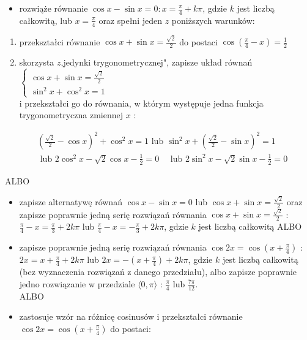 \documentclass[10pt]{article}
\begin{document}
\begin{itemize}
  \item rozwiąże równanie $\cos x-\sin x=0: x=\frac{\pi}{4}+k \pi$, gdzie $k$ jest liczbą całkowitą, lub $x=\frac{\pi}{4}$ oraz spełni jeden $z$ poniższych warunków:
\end{itemize}

\begin{enumerate}
  \item przekształci równanie $\cos x+\sin x=\frac{\sqrt{2}}{2}$ do postaci $\cos \left(\frac{\pi}{4}-x\right)=\frac{1}{2}$
  \item skorzysta $z$,jedynki trygonometrycznej", zapisze układ równań $\left\{\begin{array}{c}\cos x+\sin x=\frac{\sqrt{2}}{2} \\ \sin ^{2} x+\cos ^{2} x=1\end{array}\right.$\\
i przekształci go do równania, w którym występuje jedna funkcja trygonometryczna zmiennej $x$ :
\end{enumerate}

$$
\begin{aligned}
& \left(\frac{\sqrt{2}}{2}-\cos x\right)^{2}+\cos ^{2} x=1 \text { lub } \sin ^{2} x+\left(\frac{\sqrt{2}}{2}-\sin x\right)^{2}=1 \\
& \text { lub } 2 \cos ^{2} x-\sqrt{2} \cos x-\frac{1}{2}=0 \quad \text { lub } 2 \sin ^{2} x-\sqrt{2} \sin x-\frac{1}{2}=0
\end{aligned}
$$

ALBO

\begin{itemize}
  \item zapisze alternatywę równań $\cos x-\sin x=0$ lub $\cos x+\sin x=\frac{\sqrt{2}}{2}$ oraz zapisze poprawnie jedną serię rozwiązań równania $\cos x+\sin x=\frac{\sqrt{2}}{2}$ : $\frac{\pi}{4}-x=\frac{\pi}{3}+2 k \pi$ lub $\frac{\pi}{4}-x=-\frac{\pi}{3}+2 k \pi$, gdzie $k$ jest liczbą całkowitą ALBO
  \item zapisze poprawnie jedną serię rozwiązań równania $\cos 2 x=\cos \left(x+\frac{\pi}{4}\right)$ : $2 x=x+\frac{\pi}{4}+2 k \pi$ lub $2 x=-\left(x+\frac{\pi}{4}\right)+2 k \pi$, gdzie $k$ jest liczbą całkowitą (bez wyznaczenia rozwiązań z danego przedziału), albo zapisze poprawnie jedno rozwiązanie w przedziale $\langle 0, \pi\rangle$ : $\frac{\pi}{4}$ lub $\frac{7 \pi}{12}$.\\
ALBO
  \item zastosuje wzór na różnicę cosinusów i przekształci równanie $\cos 2 x=\cos \left(x+\frac{\pi}{4}\right)$ do postaci:
\end{itemize}
\end{document}
